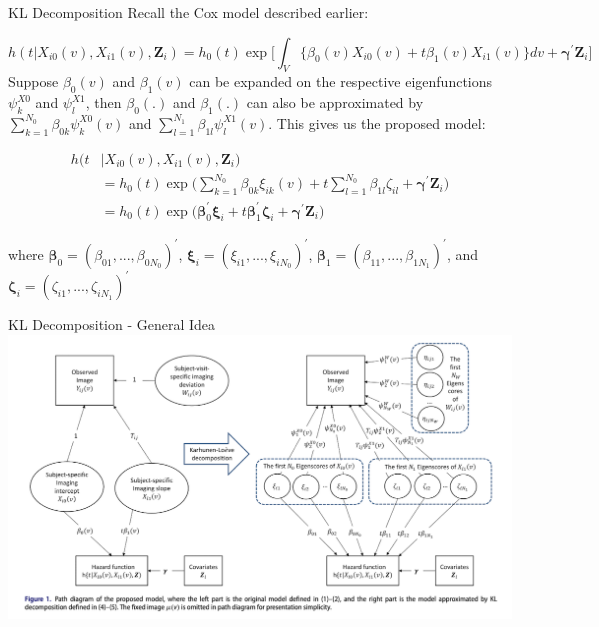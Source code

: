 \documentclass[
  ignorenonframetext,
]{beamer}
\begin{document}
\begin{frame}{KL Decomposition}
\protect\hypertarget{kl-decomposition-2}{}
Recall the Cox model described earlier:

\[
h(t|X_{i0}(v), X_{i1}(v), \boldsymbol{Z}_i) = h_0(t) \exp \Big[ \int_{V} \lbrace \beta_0(v)X_{i0}(v) + t\beta_1(v)X_{i1}(v)\rbrace dv + \boldsymbol{\gamma}^\prime\boldsymbol{Z}_i  \Big]
\] Suppose \(\beta_0(v)\) and \(\beta_1(v)\) can be expanded on the
respective eigenfunctions \(\psi_k^{X0}\) and \(\psi_l^{X1}\), then
\(\beta_0(.)\) and \(\beta_1(.)\) can also be approximated by
\(\sum^{N_0}_{k=1}\beta_{0k}\psi_k^{X0}(v)\) and
\(\sum^{N_1}_{l=1}\beta_{1l}\psi_l^{X1}(v)\). This gives us the proposed
model:

\[
\begin{aligned}
h(t&|X_{i0}(v), X_{i1}(v), \boldsymbol{Z}_i) \\&= h_0(t) \exp \Big(\sum^{N_0}_{k=1}\beta_{0k}\xi_{ik}(v) + t\sum^{N_0}_{l=1}\beta_{1l}\zeta_{il}+\boldsymbol{\gamma}^\prime \boldsymbol{Z}_i  \Big)\\
&= h_0(t) \exp \Big(\boldsymbol{\beta}_0^\prime \boldsymbol{\xi}_i + t\boldsymbol{\beta}_1^\prime \boldsymbol{\zeta}_i+\boldsymbol{\gamma}^\prime \boldsymbol{Z}_i \Big)
\end{aligned}
\]

where \(\boldsymbol{\beta}_0 = (\beta_{01},...,\beta_{0N_0})^\prime\),
\(\boldsymbol{\xi}_i = (\xi_{i1},...,\xi_{iN_0})^\prime\),
\(\boldsymbol{\beta}_1 = (\beta_{11},...,\beta_{1N_1})^\prime\), and
\(\boldsymbol{\zeta}_i = (\zeta_{i1},...,\zeta_{iN_1})^\prime\)
\end{frame}

\begin{frame}{KL Decomposition - General Idea}
\protect\hypertarget{kl-decomposition---general-idea}{}
\includegraphics[width=0.85\linewidth,height=0.85\textheight,style="float:center; padding:10px"]{images/fig3}
\end{frame}
\end{document}
